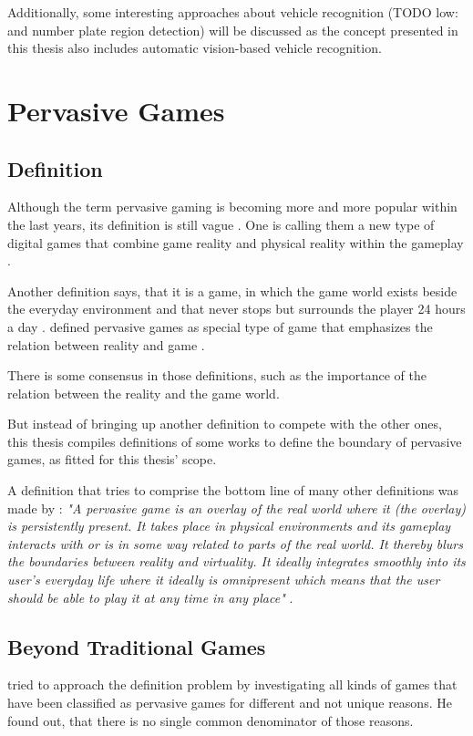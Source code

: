 Additionally, some interesting approaches about vehicle recognition (TODO low: and number plate region detection) will be discussed as the concept presented in this thesis also includes automatic vision-based vehicle recognition.

\section{Pervasive Games}
\subsection{Definition}
Although the term pervasive gaming is becoming more and more popular within the last years, its definition is still vague \citep{nieuwdorp2009pervasive}. One is calling them a new type of digital games that combine game reality and physical reality within the gameplay \citep{Lankoski:2004:CSP:1028014.1028083}.

Another definition says, that it is a game, in which the game world exists beside the everyday environment and that never stops but surrounds the player 24 hours a day \citep{sotamaa2002all}.
\citeauthor{nieuwdorp2009pervasive} defined pervasive games as special type of game that emphasizes the relation between reality and game \citep{nieuwdorp2009pervasive}.

There is some consensus in those definitions, such as the importance of the relation between the reality and the game world.

But instead of bringing up another definition to compete with the other ones, this thesis compiles definitions of some works to define the boundary of pervasive games, as fitted for this thesis' scope.

A definition that tries to comprise the bottom line of many other definitions was made by \citeauthor{hock2014augmented}: \emph{"A pervasive game is an overlay of the real world where it (the overlay) is persistently present. It takes place in physical environments and its gameplay interacts with or is in some way related to parts of the real world. It thereby blurs the boundaries between reality and virtuality. It ideally integrates smoothly into its user's everyday life where it ideally is omnipresent which means that the user should be able to play it at any time in any place"} \citep{hock2014augmented}.


\subsection{Beyond Traditional Games}
\citeauthor{montola2005exploring} tried to approach the definition problem by investigating all kinds of games that have been classified as pervasive games for different and not unique reasons. He found out, that there is no single common denominator of those reasons.

